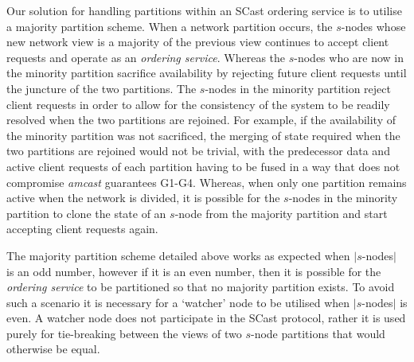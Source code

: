     Our solution for handling partitions within an \textsf{SCast} ordering service is to utilise a majority partition scheme.  When a network partition occurs, the $s$-nodes whose new network view is a majority of the previous view continues to accept client requests and operate as an \emph{ordering service}.  Whereas the $s$-nodes who are now in the minority partition sacrifice availability by rejecting future client requests until the juncture of the two partitions.  The $s$-nodes in the minority partition reject client requests in order to allow for the consistency of the system to be readily resolved when the two partitions are rejoined.  For example, if the availability of the minority partition was not sacrificed, the merging of state required when the two partitions are rejoined would not be trivial, with the predecessor data and active client requests of each partition having to be fused in a way that does not compromise \emph{amcast} guarantees G1-G4.  Whereas, when only one partition remains active when the network is divided, it is possible for the $s$-nodes in the minority partition to clone the state of an $s$-node from the majority partition and start accepting client requests again.  
    
    The majority partition scheme detailed above works as expected when $|s$-nodes$|$ is an odd number, however if it is an even number, then it is possible for the \emph{ordering service} to be partitioned so that no majority partition exists.  To avoid such a scenario it is necessary for a \textquoteleft{}watcher' node to be utilised when $|s$-nodes$|$ is even.  A watcher node does not participate in the \textsf{SCast} protocol, rather it is used purely for tie-breaking between the views of two $s$-node partitions that would otherwise be equal.  

